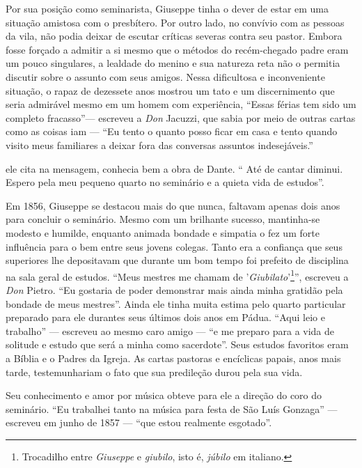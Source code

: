 \documentclass[12pt,a4paper,oneside]{book}
\begin{document}
\quad Por sua posição como seminarista, Giuseppe tinha o dever de estar em uma situação amistosa com o presbítero. Por outro lado, no convívio com as pessoas da vila, não podia deixar de escutar críticas severas contra seu pastor. Embora fosse forçado a admitir a si mesmo que o métodos do recém-chegado padre eram um pouco singulares, a lealdade do menino e sua natureza reta não o permitia discutir sobre o assunto com seus amigos.
Nessa dificultosa e inconveniente situação, o rapaz de dezessete anos mostrou um tato e um discernimento que seria admirável mesmo em um homem com experiência, ``Essas férias tem sido um completo fracasso''--- escreveu a \emph{Don} Jacuzzi, que sabia por meio de outras cartas como as coisas iam --- ``Eu tento o quanto posso ficar em casa e tento quando visito meus familiares a deixar fora das conversas assuntos indesejáveis.''
\begin{quotation}
\end{quotation}
\noindent
ele cita na mensagem, conhecia bem a obra de Dante. `` Até de cantar diminui. Espero pela meu pequeno quarto no seminário e a quieta vida de estudos''.

\quad Em 1856, Giuseppe se destacou mais do que nunca, faltavam apenas dois anos para concluir o seminário. Mesmo com um brilhante sucesso, mantinha-se modesto e humilde, enquanto animada bondade e simpatia o fez um forte influência para o bem entre seus jovens colegas. Tanto era a confiança que seus superiores lhe depositavam que durante um bom tempo foi prefeito de disciplina na sala geral de estudos. ``Meus mestres me chamam de '\emph{Giubilato}'\footnote[2]{Trocadilho entre \emph{Giuseppe} e \emph{giubilo}, isto é, \emph{júbilo} em italiano.}'', escreveu a \emph{Don} Pietro. ``Eu gostaria de poder demonstrar mais ainda minha gratidão pela bondade de meus mestres''. Ainda ele tinha muita estima pelo quarto particular preparado para ele durantes seus últimos dois anos em Pádua. ``Aqui leio e trabalho'' --- escreveu ao mesmo caro amigo --- ``e me preparo para a vida de solitude e estudo que será a minha como sacerdote''. Seus estudos favoritos eram a Bíblia e o Padres da Igreja. As cartas pastoras e encíclicas papais, anos mais tarde, testemunhariam o fato que sua predileção durou pela sua vida.

\quad Seu conhecimento e amor por música obteve para ele a direção do coro do seminário. ``Eu trabalhei tanto na música para festa de São Luís Gonzaga'' --- escreveu em junho de 1857 --- ``que estou realmente esgotado''.
\end{document}
